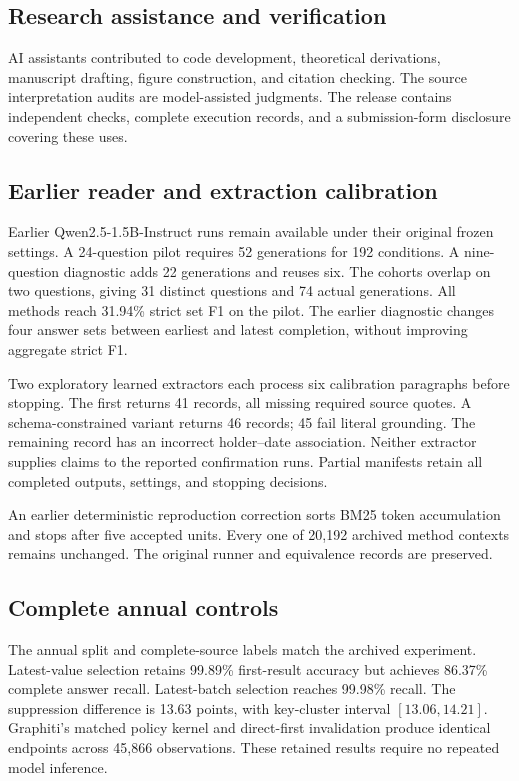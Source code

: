 \subsection{Research assistance and verification}
AI assistants contributed to code development, theoretical derivations, manuscript drafting, figure construction, and citation checking.
The source interpretation audits are model-assisted judgments.
The release contains independent checks, complete execution records, and a submission-form disclosure covering these uses.

\subsection{Earlier reader and extraction calibration}
Earlier Qwen2.5-1.5B-Instruct runs remain available under their original frozen settings.
A 24-question pilot requires 52 generations for 192 conditions.
A nine-question diagnostic adds 22 generations and reuses six.
The cohorts overlap on two questions, giving 31 distinct questions and 74 actual generations.
All methods reach 31.94\% strict set F1 on the pilot.
The earlier diagnostic changes four answer sets between earliest and latest completion, without improving aggregate strict F1.

Two exploratory learned extractors each process six calibration paragraphs before stopping.
The first returns 41 records, all missing required source quotes.
A schema-constrained variant returns 46 records; 45 fail literal grounding.
The remaining record has an incorrect holder--date association.
Neither extractor supplies claims to the reported confirmation runs.
Partial manifests retain all completed outputs, settings, and stopping decisions.

An earlier deterministic reproduction correction sorts BM25 token accumulation and stops after five accepted units.
Every one of 20,192 archived method contexts remains unchanged.
The original runner and equivalence records are preserved.

\subsection{Complete annual controls}


The annual split and complete-source labels match the archived experiment.
Latest-value selection retains 99.89\% first-result accuracy but achieves 86.37\% complete answer recall.
Latest-batch selection reaches 99.98\% recall.
The suppression difference is 13.63 points, with key-cluster interval $[13.06,14.21]$.
Graphiti's matched policy kernel and direct-first invalidation produce identical endpoints across 45,866 observations.
These retained results require no repeated model inference.

